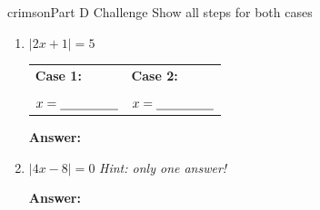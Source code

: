 \documentclass[12pt]{article}
\newcommand{\blank}{\underline{\hspace{2.8cm}}}
\newcommand{\sblank}{\underline{\hspace{1.6cm}}}
\begin{document}
\begin{partbox}{crimson}{Part D \quad Challenge
  \hfill{\normalfont\small Show all steps for both cases}}
\begin{enumerate}[label=\textbf{\arabic*.}, itemsep=10pt]
  \vspace{0.5cm}
  \item $|2x + 1| = 5$
  \vspace{0.4cm}

  \begin{tabular}{p{6.2cm} p{6.2cm}}
  \textbf{Case 1:} \underline{\hspace{5cm}} & \textbf{Case 2:} \underline{\hspace{5cm}} \\[10pt]
  \underline{\hspace{5cm}} & \underline{\hspace{5cm}} \\[10pt]
  $x = \sblank$ & $x = \sblank$
  \end{tabular}

  \vspace{0.3cm}
  \textbf{Answer:} \blank

  \vspace{0.5cm}
  \item $|4x - 8| = 0$
  \hfill{\small\itshape Hint: only one answer!}

  \vspace{2.5cm}
  \textbf{Answer:} \blank

\end{enumerate}
\end{partbox}

\newpage
\end{document}
